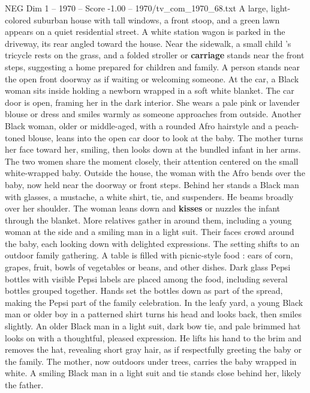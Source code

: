 \begin{textsample}{NEG Dim 1 – 1970 – Score -1.00 – 1970/tv\_com\_1970\_68.txt}  \label{ex:f1_neg_037}
A large, light-colored suburban house with tall windows, a front stoop, and a green lawn appears on a quiet residential street.
A white station wagon is parked in the driveway, its rear angled toward the house.
Near the sidewalk, a small child ’s tricycle rests on the grass, and a folded stroller or \textbf{carriage} stands near the front steps, suggesting a home prepared for children and family.
A person stands near the open front doorway as if waiting or welcoming someone.
At the car, a Black woman sits inside holding a newborn wrapped in a soft white blanket.
The car door is open, framing her in the dark interior.
She wears a pale pink or lavender blouse or dress and smiles warmly as someone approaches from outside.
Another Black woman, older or middle-aged, with a rounded Afro hairstyle and a peach-toned blouse, leans into the open car door to look at the baby.
The mother turns her face toward her, smiling, then looks down at the bundled infant in her arms.
The two women share the moment closely, their attention centered on the small white-wrapped baby.
Outside the house, the woman with the Afro bends over the baby, now held near the doorway or front steps.
Behind her stands a Black man with glasses, a mustache, a white shirt, tie, and suspenders.
He beams broadly over her shoulder.
The woman leans down and \textbf{kisses} or nuzzles the infant through the blanket.
More relatives gather in around them, including a young woman at the side and a smiling man in a light suit.
Their faces crowd around the baby, each looking down with delighted expressions.
The setting shifts to an outdoor family gathering.
A table is filled with picnic-style food : ears of corn, grapes, fruit, bowls of vegetables or beans, and other dishes.
Dark glass Pepsi bottles with visible Pepsi labels are placed among the food, including several bottles grouped together.
Hands set the bottles down as part of the spread, making the Pepsi part of the family celebration.
In the leafy yard, a young Black man or older boy in a patterned shirt turns his head and looks back, then smiles slightly.
An older Black man in a light suit, dark bow tie, and pale brimmed hat looks on with a thoughtful, pleased expression.
He lifts his hand to the brim and removes the hat, revealing short gray hair, as if respectfully greeting the baby or the family.
The mother, now outdoors under trees, carries the baby wrapped in white.
A smiling Black man in a light suit and tie stands close behind her, likely the father.

\end{textsample}
